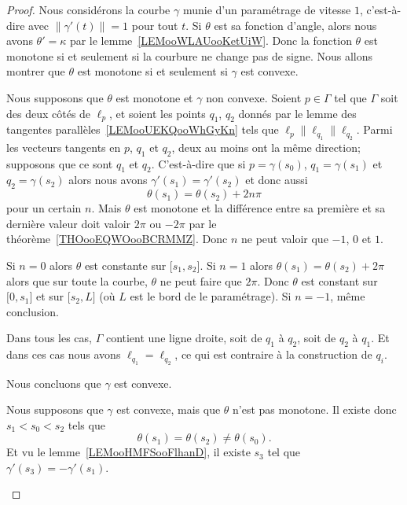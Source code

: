 \begin{proof}
	Nous considérons la courbe \( \gamma\) munie d'un paramétrage de vitesse \( 1\), c'est-à-dire avec \( \| \gamma'(t) \|=1\) pour tout \( t\). Si \( \theta\) est sa fonction d'angle, alors nous avons \( \theta'=\kappa\) par le lemme~\ref{LEMooWLAUooKetUiW}. Donc la fonction \( \theta\) est monotone si et seulement si la courbure ne change pas de signe. Nous allons montrer que \( \theta\) est monotone si et seulement si \( \gamma\) est convexe.

	\begin{subproof}
		\spitem[\( \Rightarrow\)]

		Nous supposons que \( \theta\) est monotone et \( \gamma\) non convexe. Soient \( p\in \Gamma\) tel que \( \Gamma\) soit des deux côtés de \( \ell_p\), et soient les points \( q_1\), \( q_2\) donnés par le lemme des tangentes parallèles~\ref{LEMooUEKQooWhGyKn} tels que \( \ell_p\parallel\ell_{q_1}\parallel\ell_{q_2}\). Parmi les vecteurs tangents en \( p\), \( q_1\) et \( q_2\), deux au moins ont la même direction; supposons que ce sont \( q_1\) et \( q_2\). C'est-à-dire que si \( p=\gamma(s_0)\), \( q_1=\gamma(s_1)\) et \( q_2=\gamma(s_2)\) alors nous avons \( \gamma'(s_1)=\gamma'(s_2)\) et donc aussi
		\begin{equation}
			\theta(s_1)=\theta(s_2)+2n\pi
		\end{equation}
		pour un certain \( n\). Mais \( \theta\) est monotone et la différence entre sa première et sa dernière valeur doit valoir \( 2\pi\) ou \( -2\pi\) par le théorème~\ref{THOooEQWOooBCRMMZ}. Donc \( n\) ne peut valoir que \( -1\), \( 0\) et \( 1\).

		Si \( n=0\) alors \( \theta\) est constante sur \( \mathopen[ s_1 , s_2 \mathclose]\). Si \( n=1\) alors \( \theta(s_1)=\theta(s_2)+2\pi\) alors que sur toute la courbe, \( \theta\) ne peut faire que \( 2\pi\). Donc \( \theta\) est constant sur \( \mathopen[ 0 , s_1 \mathclose]\) et sur \( \mathopen[ s_2 , L \mathclose]\) (où \( L\) est le bord de le paramétrage). Si \( n=-1\), même conclusion.

		Dans tous les cas, \( \Gamma\) contient une ligne droite, soit de \( q_1\) à \( q_2\), soit de \( q_2\) à \( q_1\). Et dans ces cas nous avons \( \ell_{q_1}=\ell_{q_2}\), ce qui est contraire à la construction de \( q_i\).

		Nous concluons que \( \gamma\) est convexe.

		\spitem[\( \Leftarrow\)]

		Nous supposons que \( \gamma\) est convexe, mais que \( \theta\) n'est pas monotone. Il existe donc \( s_1<s_0<s_2\) tels que
		\begin{equation}
			\theta(s_1)=\theta(s_2)\neq \theta(s_0).
		\end{equation}
		Et vu le lemme~\ref{LEMooHMFSooFlhanD}, il existe \( s_3\) tel que \( \gamma'(s_3)=-\gamma'(s_1)\).


\end{subproof}
\end{proof}
